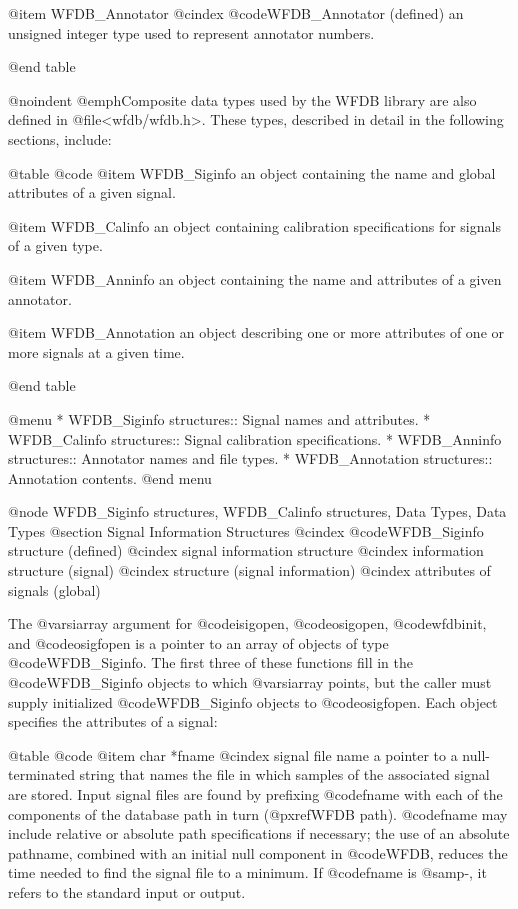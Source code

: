 {{{{{{{{{{@item WFDB_Annotator
@cindex @code{WFDB_Annotator} (defined)
an unsigned integer type used to represent annotator numbers.

@end table

@noindent
@emph{Composite data types} used by the WFDB library are also defined in
@file{<wfdb/wfdb.h>}.  These types, described in detail in the following
sections, include:

@table @code
@item WFDB_Siginfo
an object containing the name and global attributes of a given signal.

@item WFDB_Calinfo
an object containing calibration specifications for signals of a given
type.

@item WFDB_Anninfo
an object containing the name and attributes of a given annotator.

@item WFDB_Annotation
an object describing one or more attributes of one or more signals at a
given time.

@end table

@menu
* WFDB_Siginfo structures::		Signal names and attributes.
* WFDB_Calinfo structures::		Signal calibration specifications.
* WFDB_Anninfo structures::		Annotator names and file types.
* WFDB_Annotation structures::		Annotation contents.
@end menu

@node WFDB_Siginfo structures, WFDB_Calinfo structures, Data Types, Data Types
@section Signal Information Structures
@cindex @code{WFDB_Siginfo} structure (defined)
@cindex signal information structure
@cindex information structure (signal)
@cindex structure (signal information)
@cindex attributes of signals (global)

The @var{siarray} argument for @code{isigopen}, @code{osigopen},
@code{wfdbinit}, and @code{osigfopen} is a pointer to an array of
objects of type @code{WFDB_Siginfo}.  The first three of these functions
fill in the @code{WFDB_Siginfo} objects to which @var{siarray} points, but
the caller must supply initialized @code{WFDB_Siginfo} objects to
@code{osigfopen}.  Each object specifies the attributes of a
signal:

@table @code
@item char *fname
@cindex signal file name
a pointer to a null-terminated string that names the file in which
samples of the associated signal are stored.  Input signal files are
found by prefixing @code{fname} with each of the components of the
database path in turn (@pxref{WFDB path}).  @code{fname} may include
relative or absolute path specifications if necessary; the use of an
absolute pathname, combined with an initial null component in @code{WFDB},
reduces the time needed to find the signal file to a minimum.  If
@code{fname} is @samp{-}, it refers to the standard input or
output.

}}}}}}}}}}
